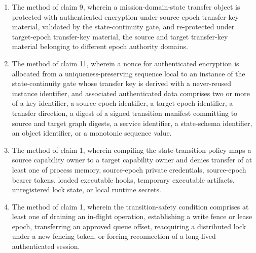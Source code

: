 \documentclass[11pt,letterpaper]{article}
\begin{document}
\begin{enumerate}[leftmargin=2em,itemsep=3pt,label=\arabic*.]
\item The method of claim 9, wherein a mission-domain-state transfer object is protected with authenticated encryption under source-epoch transfer-key material, validated by the state-continuity gate, and re-protected under target-epoch transfer-key material, the source and target transfer-key material belonging to different epoch authority domains.
\item The method of claim 11, wherein a nonce for authenticated encryption is allocated from a uniqueness-preserving sequence local to an instance of the state-continuity gate whose transfer key is derived with a never-reused instance identifier, and associated authenticated data comprises two or more of a key identifier, a source-epoch identifier, a target-epoch identifier, a transfer direction, a digest of a signed transition manifest committing to source and target graph digests, a service identifier, a state-schema identifier, an object identifier, or a monotonic sequence value.
\item The method of claim 1, wherein compiling the state-transition policy maps a source capability owner to a target capability owner and denies transfer of at least one of process memory, source-epoch private credentials, source-epoch bearer tokens, loaded executable hooks, temporary executable artifacts, unregistered lock state, or local runtime secrets.
\item The method of claim 1, wherein the transition-safety condition comprises at least one of draining an in-flight operation, establishing a write fence or lease epoch, transferring an approved queue offset, reacquiring a distributed lock under a new fencing token, or forcing reconnection of a long-lived authenticated session.

\end{enumerate}
\end{document}
